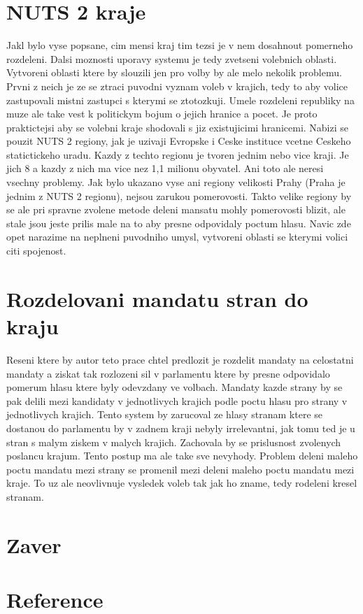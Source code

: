 \documentclass[12pt,a4paper]{report}
\begin{document}
\section{NUTS 2 kraje}
Jakl bylo vyse popsane, cim mensi kraj tim tezsi je v nem dosahnout pomerneho rozdeleni.
Dalsi moznosti uporavy systemu je tedy zvetseni volebnich oblasti.
Vytvoreni oblasti ktere by slouzili jen pro volby by ale melo nekolik problemu.
Prvni z neich je ze se ztraci puvodni vyznam voleb v krajich, tedy to aby volice zastupovali  mistni zastupci s kterymi se ztotozkuji.
Umele rozdeleni republiky na  muze ale take vest k politickym bojum o jejich hranice a pocet. %
Je proto praktictejsi aby se volebni kraje shodovali s jiz existujicimi hranicemi.
Nabizi se pouzit NUTS 2 regiony, jak je uzivaji Evropske i Ceske instituce vcetne Ceskeho statictickeho uradu.
Kazdy z techto regionu je tvoren jednim nebo vice kraji.
Je jich 8 a kazdy z nich ma vice nez 1,1 milionu obyvatel.
Ani toto ale neresi vsechny problemy.
Jak bylo ukazano vyse ani regiony velikosti Prahy (Praha je jednim z NUTS 2 regionu), nejsou zarukou pomerovosti.
Takto velike regiony by se ale pri spravne zvolene metode deleni mansatu mohly pomerovosti blizit, ale stale jsou jeste prilis male na to aby presne odpovidaly poctum hlasu.
Navic zde opet narazime na neplneni puvodniho umysl, vytvoreni oblasti se kterymi volici citi spojenost.
\section{Rozdelovani mandatu stran do kraju}
Reseni ktere by autor teto prace chtel predlozit je rozdelit mandaty na celostatni mandaty a ziskat tak rozlozeni sil v parlamentu ktere by presne odpovidalo pomerum hlasu ktere byly odevzdany ve volbach.
Mandaty kazde strany by se pak delili mezi kandidaty v jednotlivych krajich podle poctu hlasu pro strany v jednotlivych krajich.
Tento system by zarucoval ze hlasy stranam ktere se dostanou do parlamentu by v zadnem kraji nebyly irrelevantni, jak tomu ted je u stran s malym ziskem v malych krajich. 
Zachovala by se prislusnost zvolenych poslancu krajum.
Tento postup ma ale take sve nevyhody.
Problem deleni maleho poctu mandatu mezi strany se promenil mezi deleni maleho poctu mandatu mezi kraje.
To uz ale neovlivnuje vysledek voleb tak jak ho zname, tedy rodeleni kresel stranam.


\section{Zaver}

\section{Reference}
\printbibliography[heading=none]
\end{document}
